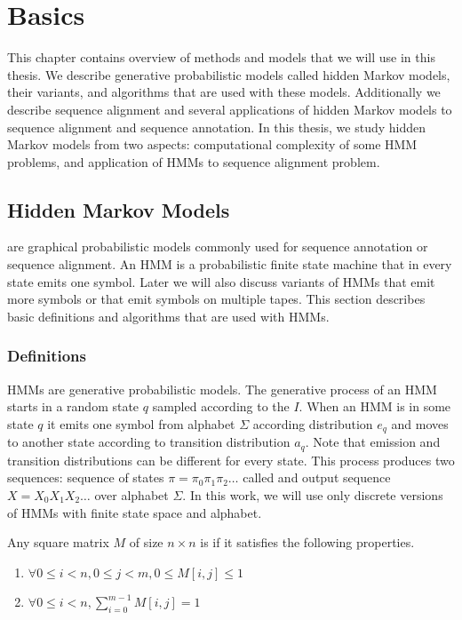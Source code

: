 \chapter{Basics}
\label{CHAPTER:BASICS}

This chapter contains overview of methods and models that we will use in this
thesis. We describe generative probabilistic models called hidden Markov
models, their variants, and algorithms that are used with these models.
Additionally we describe sequence alignment and several applications of hidden
Markov models to sequence alignment and sequence annotation. In this thesis, we
study hidden Markov models from two aspects: computational complexity of some
HMM problems, and application of HMMs to sequence alignment problem.

\section{Hidden Markov Models}
 are graphical probabilistic models
commonly used for sequence annotation or sequence alignment. An HMM is a
probabilistic finite state machine that in every state emits one symbol. Later
we will also discuss variants of HMMs that emit more symbols or that emit
symbols on multiple tapes. This section describes basic definitions
and algorithms that are used with HMMs.

\subsection{Definitions}\label{SECTION:HMMDEF}
                       
HMMs are generative probabilistic models.
The generative process of an HMM starts in a random state $q$ sampled according
to the  $I$.  When an HMM is in some state $q$ it emits one symbol from
alphabet $\Sigma$ according distribution $e_q$ and moves to another state
according to transition distribution $a_q$. Note that emission and transition
distributions can be different for every state.  This process produces two
sequences: sequence of states $\pi=\pi_0\pi_1\pi_2\dots$ called
 and output sequence $X=X_0X_1X_2\dots$ over alphabet
$\Sigma$. In this work, we will use only discrete versions of HMMs with finite state
space and alphabet.  


\begin{definition}
Any square matrix $M$ of size $n\times n$ is  if it satisfies the
following properties.
\begin{enumerate}
\item $\forall 0\leq i<n,0\leq j < m, 0\leq M[i,j]\leq 1$
\item $\forall 0\le i<n, \sum_{i=0}^{m-1}M[i,j]=1$
\end{enumerate}
\end{definition}

